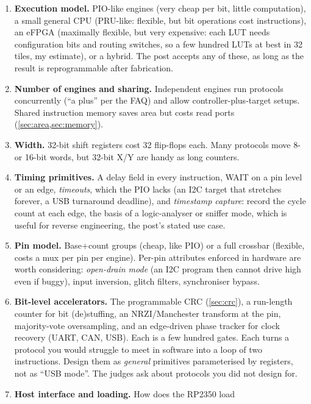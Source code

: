\begin{enumerate}[label=\textbf{D\arabic*.}]
  \item \textbf{Execution model.} PIO-like engines (very cheap per bit,
    little computation), a small general CPU (PRU-like: flexible, but bit
    operations cost instructions), an eFPGA (maximally flexible, but very
    expensive: each LUT needs configuration bits and routing switches, so a
    few hundred LUTs at best in 32 tiles, my estimate), or a hybrid. The
    post accepts any of these, as long as the result is reprogrammable after
    fabrication.
  \item \textbf{Number of engines and sharing.} Independent engines run
    protocols concurrently (``a plus'' per the FAQ) and allow
    controller-plus-target setups. Shared instruction memory saves area but
    costs read ports (\cref{sec:area,sec:memory}).
  \item \textbf{Width.} 32-bit shift registers cost 32 flip-flops each. Many
    protocols move 8- or 16-bit words, but 32-bit X/Y are handy as long
    counters.
  \item \textbf{Timing primitives.} A delay field in every instruction,
    WAIT on a pin level or an edge, \emph{timeouts}, which the PIO lacks (an
    I2C target that stretches forever, a USB turnaround deadline), and
    \emph{timestamp capture}: record the cycle count at each edge, the
    basis of a logic-analyser or sniffer mode, which is useful for reverse
    engineering, the post's stated use case.
  \item \textbf{Pin model.} Base+count groups (cheap, like PIO) or a full
    crossbar (flexible, costs a mux per pin per engine). Per-pin
    attributes enforced in hardware are worth considering: \emph{open-drain
    mode} (an I2C program then cannot drive high even if buggy), input
    inversion, glitch filters, synchroniser bypass.
  \item \textbf{Bit-level accelerators.} The programmable CRC
    (\cref{sec:crc}), a run-length counter for bit (de)stuffing, an
    NRZI/Manchester transform at the pin, majority-vote oversampling, and
    an edge-driven phase tracker for clock recovery (UART, CAN, USB). Each
    is a few hundred gates. Each turns a protocol you would struggle to
    meet in software into a loop of two instructions. Design them as
    \emph{general} primitives parameterised by registers, not as
    ``USB mode''. The judges ask about protocols you did not design for.
  \item \textbf{Host interface and loading.} How does the RP2350 load

\end{enumerate}
